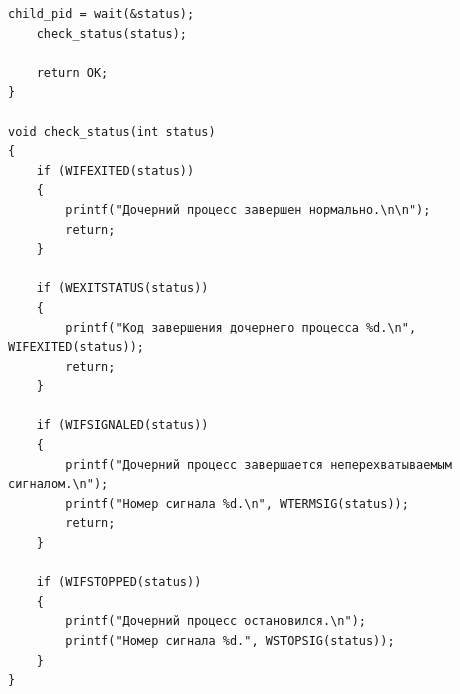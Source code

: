 \begin{lstlisting}[label=some-code,caption=Программа 4.]
	child_pid = wait(&status);
	check_status(status);

	return OK;
}

void check_status(int status)
{
	if (WIFEXITED(status))
	{
		printf("Дочерний процесс завершен нормально.\n\n");
		return;
	}

	if (WEXITSTATUS(status))
	{
		printf("Код завершения дочернего процесса %d.\n", WIFEXITED(status));
		return;
	}

	if (WIFSIGNALED(status))
	{
		printf("Дочерний процесс завершается неперехватываемым сигналом.\n");
		printf("Номер сигнала %d.\n", WTERMSIG(status));
		return;
	}

	if (WIFSTOPPED(status))
	{
		printf("Дочерний процесс остановился.\n");
		printf("Номер сигнала %d.", WSTOPSIG(status));
	}
}
\end{lstlisting}


\begin{figure}[ht!]
\end{figure}

